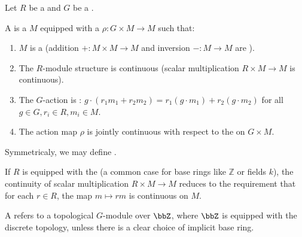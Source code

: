 \begin{definition} \label{definition:topological_module_over_a_group_ring_of_a_topological_gropu_over_a_topological_ring}
Let $R$ be a  and $G$ be a . 

A  is a  $M$ equipped with a  $\rho: G \times M \to M$ such that:
\begin{enumerate}
    \item $M$ is a  (addition $+: M \times M \to M$ and inversion $-: M \to M$ are ).
    \item The $R$-module structure is continuous (scalar multiplication $R \times M \to M$ is continuous).
    \item The $G$-action is : $g \cdot (r_1 m_1 + r_2 m_2) = r_1 (g \cdot m_1) + r_2 (g \cdot m_2)$ for all $g \in G, r_i \in R, m_i \in M$.
    \item The action map $\rho$ is jointly continuous with respect to the  on $G \times M$.
\end{enumerate}

Symmetricaly, we may define .

If $R$ is equipped with the  (a common case for base rings like $\mathbb{Z}$ or fields $k$), the continuity of scalar multiplication $R \times M \to M$ reduces to the requirement that for each $r \in R$, the map $m \mapsto rm$ is continuous on $M$.

A  refers to a topological $G$-module over $\bbZ$, where $\bbZ$ is equipped with the discrete topology, unless there is a clear choice of implicit base ring.

\end{definition}